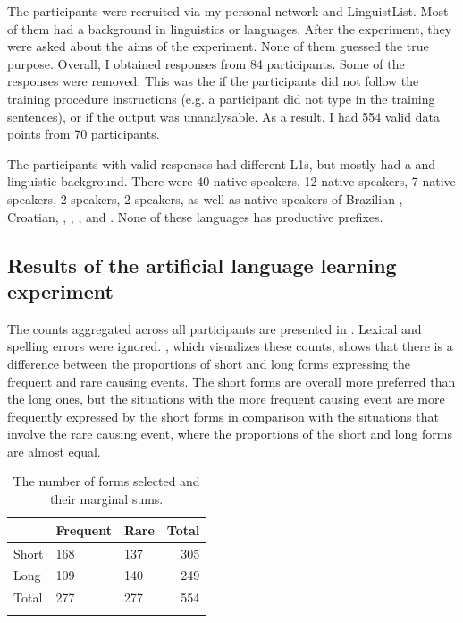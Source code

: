 \documentclass[output=paper]{langsci/langscibook}
\begin{document}
The participants were recruited via my personal network and LinguistList. Most of them had a background in linguistics or languages. After the experiment, they were asked about the aims of the experiment. None of them guessed the true purpose. Overall, I obtained responses from 84 participants. Some of the responses were removed. This was the  if the participants did not follow the training procedure instructions (e.g. a participant did not type in the training sentences), or if the output was unanalysable. As a result, I had 554 valid data points from 70 participants. 

The participants with valid responses had different L1s, but mostly had a  and  linguistic background. There were 40 native  speakers, 12 native  speakers, 7 native  speakers, 2  speakers, 2  speakers, as well as native speakers of Brazilian , Croatian, , , ,  and . None of these languages has productive  prefixes.

\subsection{Results of the artificial language learning experiment}

The counts aggregated across all participants are presented in . Lexical and spelling errors were ignored. , which visualizes these counts, shows that there is a difference between the proportions of short and long forms expressing the frequent and rare causing events. The short forms are overall more preferred than the long ones, but the situations with the more frequent causing event are more frequently expressed by the short forms in comparison with the situations that involve the rare causing event, where the proportions of the short and long forms are almost equal.

\begin{table}
\begin{tabularx}{.8\textwidth}{XYY@{\qquad\qquad}r} 
\lsptoprule
& Frequent & Rare &  {Total}\\
\midrule
Short & 168 & 137 &  {305}\\
Long & 109 & 140 &  {249}\\
\midrule 
 {Total} &  {277} &  {277} &  {554}\\
\lspbottomrule
\end{tabularx} 
\caption{The number of forms selected and their marginal sums.}
\label{tab:levshina:1}
\end{table}
\end{document}
